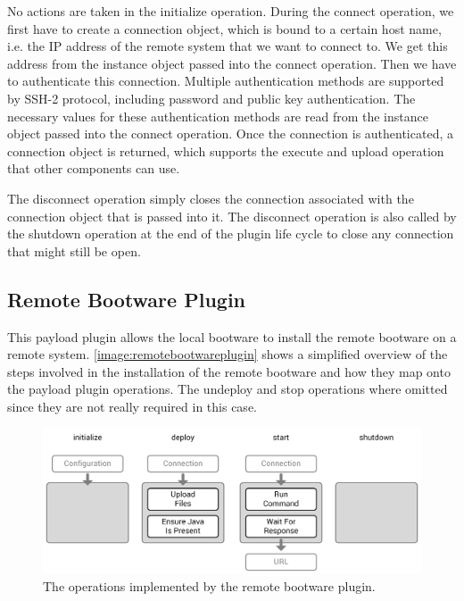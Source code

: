 No actions are taken in the initialize operation.
During the connect operation, we first have to create a connection object, which is bound to a certain host name, i.e. the IP address of the remote system that we want to connect to.
We get this address from the instance object passed into the connect operation.
Then we have to authenticate this connection.
Multiple authentication methods are supported by SSH-2 protocol, including password and public key authentication.
The necessary values for these authentication methods are read from the instance object passed into the connect operation.
Once the connection is authenticated, a connection object is returned, which supports the execute and upload operation that other components can use.

The disconnect operation simply closes the connection associated with the connection object that is passed into it.
The disconnect operation is also called by the shutdown operation at the end of the plugin life cycle to close any connection that might still be open.

\subsection{Remote Bootware Plugin}

This payload plugin allows the local bootware to install the remote bootware on a remote system.
\autoref{image:remotebootwareplugin} shows a simplified overview of the steps involved in the installation of the remote bootware and how they map onto the payload plugin operations.
The undeploy and stop operations where omitted since they are not really required in this case.

\begin{figure}[!htbp]
	\centering
	\includegraphics[resolution=600]{implementation/assets/remotebootware_plugin}
	\caption{The operations implemented by the remote bootware plugin.}
	\label{image:remotebootwareplugin}
\end{figure}


